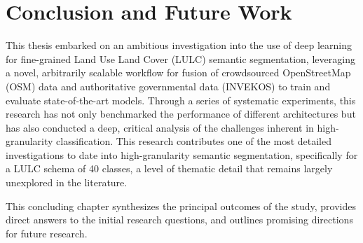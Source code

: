 \documentclass{report}
\begin{document}
\clearpage %

\section{Conclusion and Future Work}
This thesis embarked on an ambitious investigation into the use of deep learning for fine-grained Land Use Land Cover (LULC) semantic segmentation, leveraging a novel, arbitrarily scalable workflow for fusion of crowdsourced OpenStreetMap (OSM) data and authoritative governmental data (INVEKOS) to train and evaluate state-of-the-art models. Through a series of systematic experiments, this research has not only benchmarked the performance of different architectures but has also conducted a deep, critical analysis of the challenges inherent in high-granularity classification. This research contributes one of the most detailed investigations to date into high-granularity semantic segmentation, specifically for a LULC schema of 40 classes, a level of thematic detail that remains largely unexplored in the literature. \par
This concluding chapter synthesizes the principal outcomes of the study, provides direct answers to the initial research questions, and outlines promising directions for future research.
\end{document}
